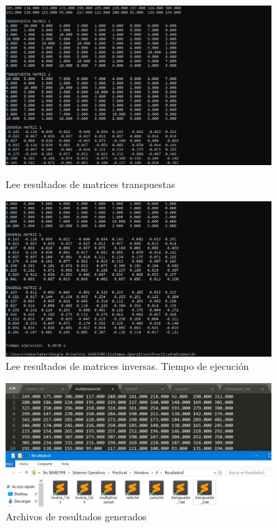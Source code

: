 \documentclass[12pt]{article}
\begin{document}
\begin{itemize}
\begin{itemize}
\begin{figure}[h!]
                        \includegraphics[width=0.9\textwidth]{Practica4/Images/Windows/8_11.PNG}
                        \caption{Lee resultados de matrices transpuestas}
                        
                        \includegraphics[width=0.9\textwidth]{Practica4/Images/Windows/8_12.PNG}
                        \caption{Lee resultados de matrices inversas. Tiempo de ejecución}
                        
                    \end{figure}
                    \clearpage
                    \begin{figure}[h!]
                        \centering
                        
                        \includegraphics[width=0.9\textwidth]{Practica4/Images/Windows/8_13.PNG}
                        \caption{Archivos  de resultados generados}
                        

\end{figure}
\end{itemize}
\end{itemize}
\end{document}
